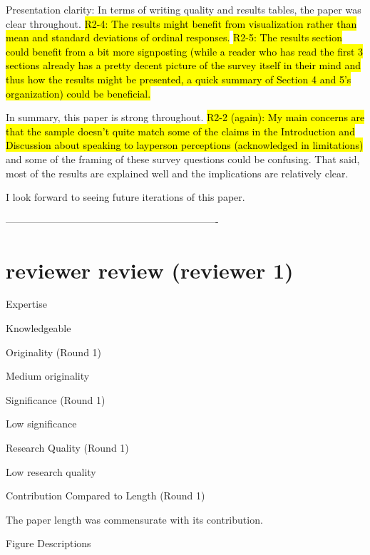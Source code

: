 Presentation clarity: In terms of writing quality and results tables, the paper
was clear throughout. \hl{R2-4: The results might benefit from visualization
rather than mean and standard deviations of ordinal responses.}
\hl{R2-5: The
results section could benefit from a bit more signposting (while a
reader who has read the first 3 sections already has a pretty decent
picture of the survey itself in their mind and thus how the results
might be presented, a quick summary of Section 4 and 5's organization)
could be beneficial.}

In summary, this paper is strong throughout. 
\hl{R2-2 (again): My main concerns are that the sample
doesn't quite match some of the claims in the Introduction and
Discussion about speaking to layperson perceptions (acknowledged in
limitations)}
and some of the framing of these survey questions could
be confusing. That said, most of the results are explained well and
the implications are relatively clear.

I look forward to seeing future iterations of this paper.

----------------------------------------------------------------

\section*{reviewer review (reviewer 1)}

Expertise

Knowledgeable

Originality (Round 1)

Medium originality

Significance (Round 1)

Low significance

Research Quality (Round 1)

Low research quality

Contribution Compared to Length (Round 1)

The paper length was commensurate with its contribution.

Figure Descriptions



